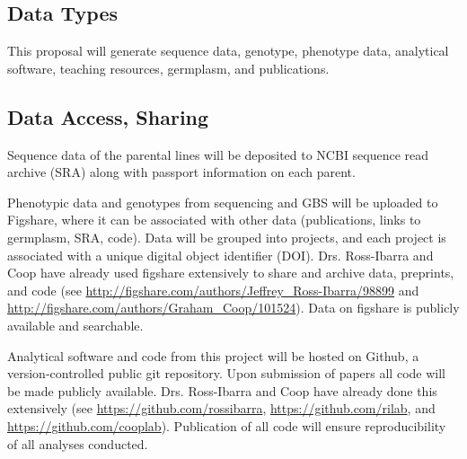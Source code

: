 %


\subsection*{Data Types}

This proposal will generate sequence data, genotype, phenotype data, analytical software, teaching resources, germplasm, and publications.

\subsection*{Data Access, Sharing}

Sequence data of the parental lines will be deposited to NCBI sequence read archive (SRA) along with passport information on each parent. 

Phenotypic data and genotypes from sequencing and GBS will be uploaded to Figshare, where it can be associated with other data (publications, links to germplasm, SRA, code). Data will be grouped into projects, and each project is associated with a unique digital object identifier (DOI). Drs. Ross-Ibarra and Coop have already used figshare extensively to share and archive data, preprints, and code (see \url{http://figshare.com/authors/Jeffrey_Ross-Ibarra/98899}  and \url{http://figshare.com/authors/Graham_Coop/101524}). Data on figshare is publicly available and searchable.

Analytical software and code from this project will be hosted on Github, a version-controlled public git repository.  Upon submission of papers all code will be made publicly available.  Drs. Ross-Ibarra and Coop have already done this extensively (see \url{https://github.com/rossibarra}, \url{https://github.com/rilab}, and \url{https://github.com/cooplab}). Publication of all code will ensure reproducibility of all analyses conducted.  

